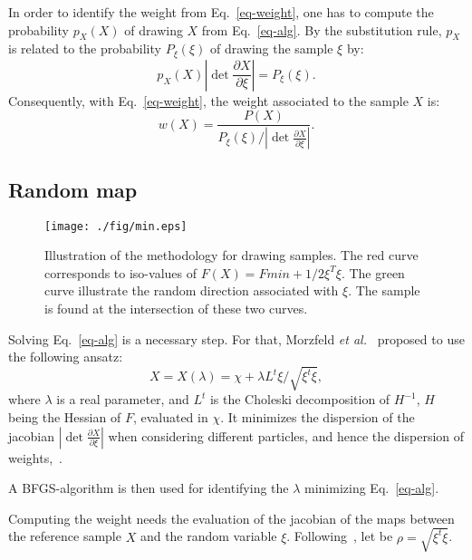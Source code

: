 \documentclass[aip,pof,nofootinbib,reprint,onecolumn]{revtex4-1}
\newcommand{\mypar}[1]{\left(#1\right)}
\newcommand{\rpoint}{X}
\begin{document}
In order to identify the weight from Eq.~\eqref{eq-weight}, one has to compute the probability $p_{\rpoint}\mypar{\rpoint}$ of drawing $X$ from Eq.~\eqref{eq-alg}.
By the substitution rule, $p_X$ is related to the probability $P_{\xi}\mypar{\xi}$ of drawing the sample $\xi$ by:
$$
p_{\rpoint}\mypar{\rpoint} \left|\det \frac{\partial \rpoint}{\partial \xi}\right|  = P_{\xi}\mypar{\xi}.
$$
Consequently, with Eq.~\eqref{eq-weight}, the weight associated to the sample $\rpoint$ is:
\begin{equation}
w\mypar{\rpoint} = \frac{P\mypar{\rpoint}}{P_{\xi}\mypar{\xi}/\left|\det \frac{\partial \rpoint}{\partial \xi}\right|}.
\label{eq-weight_dev}
\end{equation}




\subsection{Random map}
\begin{figure}[t]
\center
\texttt{[image: ./fig/min.eps]}
\caption{\small Illustration of the methodology for drawing samples. The red curve corresponds to iso-values of $F\mypar{\rpoint} = Fmin+1/2 \xi^T\xi$. The green curve illustrate the random direction associated with $\xi$. The sample is found at the intersection of these two curves.}
\label{fig-rmap}
\end{figure}

Solving Eq.~\eqref{eq-alg} is a necessary step. For that, Morzfeld \emph{et al.}~\cite{Morzfeld2012} proposed to use the following ansatz:
\begin{equation}
\rpoint = \rpoint\mypar{\lambda} = \chi + \lambda L^t \xi/\sqrt{\xi^t \xi},
\label{eq-ansatz}
\end{equation}
where $\lambda$ is a real parameter, and $L^t$ is the Choleski decomposition of $H^{-1}$, $H$ being the Hessian of $F$, evaluated in $\chi$.
It minimizes the dispersion of the jacobian $\left|\det \frac{\partial \rpoint}{\partial \xi}\right|$ when considering different particles, and hence the dispersion of weights,~\citep{Morzfeld2012}.

A BFGS-algorithm is then used for identifying the $\lambda$ minimizing Eq.~\eqref{eq-alg}.

Computing the weight needs the evaluation of the jacobian of the maps between the reference sample $\rpoint$ and the random variable $\xi$.
Following~\citep{Morzfeld2012}, let be $\rho = \sqrt{\xi^t \xi}$.
\end{document}
